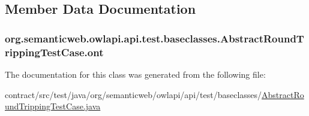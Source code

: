 \subsection{Member Data Documentation}
\hypertarget{classorg_1_1semanticweb_1_1owlapi_1_1api_1_1test_1_1baseclasses_1_1_abstract_round_tripping_test_case_aa3cd8b4bfda1074c9cb4aea4680c5611}{
\subsubsection[{ont}]{ org.\-semanticweb.\-owlapi.\-api.\-test.\-baseclasses.\-Abstract\-Round\-Tripping\-Test\-Case.\-ont\hspace{0.3cm}{\ttfamily [private]}}}\label{classorg_1_1semanticweb_1_1owlapi_1_1api_1_1test_1_1baseclasses_1_1_abstract_round_tripping_test_case_aa3cd8b4bfda1074c9cb4aea4680c5611}


The documentation for this class was generated from the following file\-:\begin{DoxyCompactItemize}
\item 
contract/src/test/java/org/semanticweb/owlapi/api/test/baseclasses/\hyperlink{_abstract_round_tripping_test_case_8java}{Abstract\-Round\-Tripping\-Test\-Case.\-java}\end{DoxyCompactItemize}
